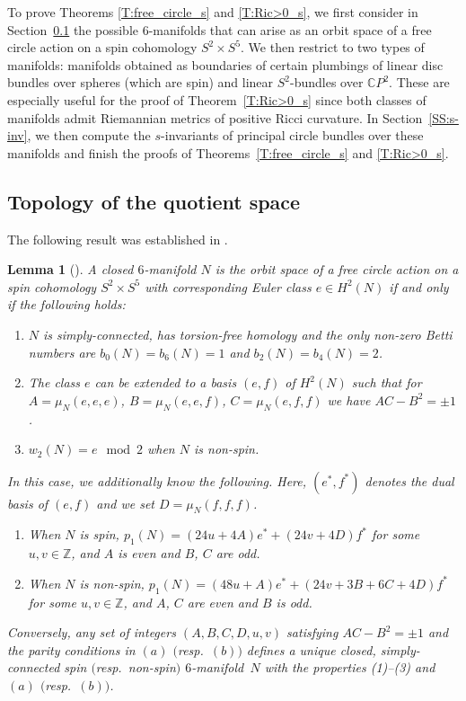 \documentclass[10pt,a4paper]{amsart}
\numberwithin{equation}{section}
\newtheorem{Lemma}[Theorem]{Lemma}
\theoremstyle{definition}
\numberwithin{table}{section}
\newcommand{\Z}{\mathbb{Z}}
\newcommand{\C}{\mathbb{C}}
\begin{document}
To prove Theorems \ref{T:free_circle_s} and \ref{T:Ric>0_s}, we first consider in Section~\ref{SS:quot_space} the possible $6$-manifolds that can arise as an orbit space of a free circle action on a spin cohomology $S^2\times S^5$. We then restrict to two types of manifolds: manifolds obtained as boundaries of certain plumbings of linear disc bundles over spheres (which are spin) and linear $S^2$-bundles over $\C P^2$. These are especially useful for the proof of Theorem~\ref{T:Ric>0_s} since both classes of manifolds admit Riemannian metrics of positive Ricci curvature. In Section~\ref{SS:s-inv}, we then compute the $s$-invariants of principal circle bundles over these manifolds and finish the proofs of Theorems~\ref{T:free_circle_s} and \ref{T:Ric>0_s}.

\subsection{Topology of the quotient space} \label{SS:quot_space}

The following result was established in \cite{Xu25}.

\begin{Lemma}[{\cite[Lemmas 1 and 2]{Xu25}}]\label{L:N_orbit_space}
	A closed $6$-manifold $N$ is the orbit space of a free circle action on a spin cohomology $S^2\times S^5$ with corresponding Euler class $e\in H^2(N)$ if and only if the following holds:
	\begin{enumerate}\itemsep=0pt
		\item[$(1)$] $N$ is simply-connected, has torsion-free homology and the only non-zero Betti numbers are $b_0(N)=b_6(N)=1$ and $b_2(N)=b_4(N)=2$.
		\item[$(2)$] The class $e$ can be extended to a basis $(e,f)$ of $H^2(N)$ such that for $A=\mu_N(e,e,e)$, $B=\mu_N(e,e,f)$, $C=\mu_N(e,f,f)$ we have $AC-B^2=\pm 1$.
		\item[$(3)$] $w_2(N)=e\mod 2$ when $N$ is non-spin.
	\end{enumerate}
	In this case, we additionally know the following. Here, $(e^*,f^*)$ denotes the dual basis of $(e,f)$ and we set $D=\mu_N(f,f,f)$.
	\begin{enumerate}\itemsep=0pt
		\item[$(a)$] When $N$ is spin, $p_1(N)=(24u+4A)e^*+(24v+4D)f^*$ for some $u,v\in\Z$, and $A$ is even and $B$, $C$ are odd.
		\item[$(b)$] When $N$ is non-spin, $p_1(N)=(48u+A)e^*+(24v+3B+6C+4D)f^*$ for some $u,v\in\Z$, and $A$, $C$ are even and $B$ is odd.
	\end{enumerate}
	Conversely, any set of integers $(A,B,C,D,u,v)$ satisfying $AC-B^2=\pm1$ and the parity conditions in $(a)$ $($resp.\ $(b))$ defines a unique closed, simply-connected spin $($resp.\ non-spin$)$ $6$-mani\-fold~$N$ with the properties {\rm (1)--(3)} and $(a)$ $($resp.\ $(b))$.
\end{Lemma}
\end{document}
